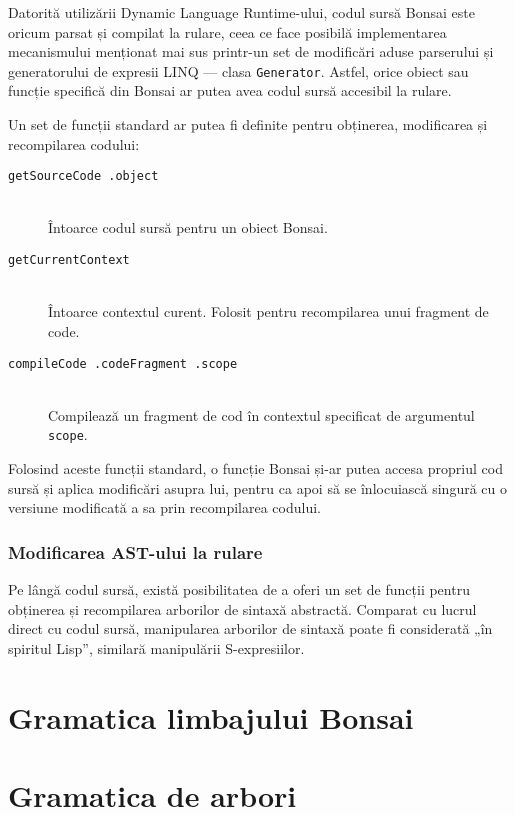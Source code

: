 \documentclass[12pt,a4paper]{memoir}
\renewcommand{\c}{\texttt}
\begin{document}
Datorită utilizării Dynamic Language Runtime-ului, codul sursă Bonsai este oricum parsat și compilat la rulare, ceea ce face posibilă implementarea mecanismului menționat mai sus printr-un set de modificări aduse parserului și generatorului de expresii LINQ — clasa \c{Generator}. Astfel, orice obiect sau funcție specifică din Bonsai ar putea avea codul sursă accesibil la rulare. 

Un set de funcții standard ar putea fi definite pentru obținerea, modificarea și recompilarea codului:

\begin{description}
\item[\c{getSourceCode .object}]\hfill\\ Întoarce codul sursă pentru un obiect Bonsai.
\item[\c{getCurrentContext}]\hfill\\ Întoarce contextul curent. Folosit pentru recompilarea unui fragment de code.
\item[\c{compileCode .codeFragment .scope}]\hfill\\ Compilează un fragment de cod în contextul specificat de argumentul \c{scope}. 
\end{description}

Folosind aceste funcții standard, o funcție Bonsai și-ar putea accesa propriul cod sursă și aplica modificări asupra lui, pentru ca apoi să se înlocuiască singură cu o versiune modificată a sa prin recompilarea codului.

\subsection{Modificarea AST-ului la rulare}

Pe lângă codul sursă, există posibilitatea de a oferi un set de funcții pentru obținerea și recompilarea arborilor de sintaxă abstractă. Comparat cu lucrul direct cu codul sursă, manipularea arborilor de sintaxă poate fi considerată „în spiritul Lisp”, similară manipulării S-expresiilor.



\begin{appendices}


\chapter{Gramatica limbajului Bonsai}
\label{app:grammar}

\chapter{Gramatica de arbori}
\label{app:tree_grammar}

\end{appendices}


{}
\end{document}

